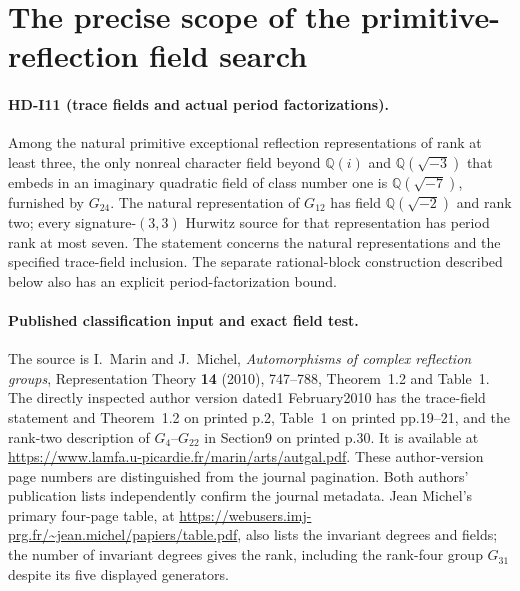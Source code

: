 \section{The precise scope of the primitive-reflection field search}

\paragraph{HD-I11 (trace fields and actual period factorizations).}
Among the natural primitive exceptional reflection representations
of rank at least three, the only nonreal character field beyond
$\mathbb Q(i)$ and $\mathbb Q(\sqrt{-3})$ that embeds in an
imaginary quadratic field of class number one is
$\mathbb Q(\sqrt{-7})$, furnished by $G_{24}$.
The natural representation of $G_{12}$ has field
$\mathbb Q(\sqrt{-2})$ and rank two; every signature-$(3,3)$
Hurwitz source for that representation has period rank at most seven.
The statement concerns the natural representations and the specified
trace-field inclusion. The separate rational-block construction
described below also has an explicit period-factorization bound.

\paragraph{Published classification input and exact field test.}
The source is I.~Marin and J.~Michel,
\emph{Automorphisms of complex reflection groups},
Representation Theory \textbf{14} (2010), 747--788,
Theorem~1.2 and Table~1.
The directly inspected author version dated1 February2010 has the
trace-field statement and Theorem~1.2 on printed p.2, Table~1 on
printed pp.19--21, and the rank-two description of $G_4$--$G_{22}$
in Section9 on printed p.30. It is available at
\url{https://www.lamfa.u-picardie.fr/marin/arts/autgal.pdf}.
These author-version page numbers are distinguished from the
journal pagination. Both authors' publication lists independently
confirm the journal metadata. Jean Michel's primary four-page
table, at
\url{https://webusers.imj-prg.fr/~jean.michel/papiers/table.pdf},
also lists the invariant degrees and fields; the number of
invariant degrees gives the rank, including the rank-four
group $G_{31}$ despite its five displayed generators.

